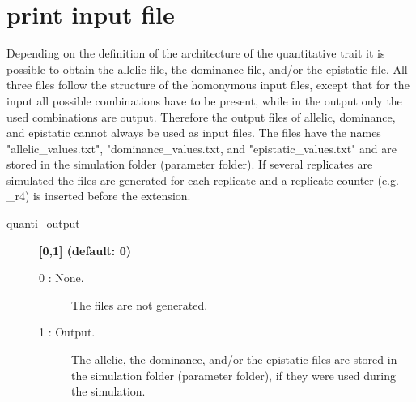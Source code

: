 \documentclass[letterpaper,12pt,oneside]{book}
\begin{document}
\section{print input file}
Depending on the definition of the architecture of the quantitative trait it is possible to obtain the allelic file, the dominance file, and/or the epistatic file. All three files follow the structure of the homonymous input files, except that for the input all possible combinations have to be present, while in the output only the used combinations are output. Therefore the output files of allelic, dominance, and epistatic cannot always be used as input files. The files have the names \textsf{"allelic\_values.txt"}, \textsf{"dominance\_values.txt}, and \textsf{"epistatic\_values.txt"} and are stored in the simulation folder (parameter \textsf{folder}). If several replicates are simulated the files are generated for each replicate and a replicate counter (e.g. \_r4) is inserted before the extension.

\begin{description}
\item[quanti\_output] \textbf{[0,1] (default: 0)}\\
\begin {description}
\item[0 : None.] The files are not generated.
\item[1 : Output.] The allelic, the dominance, and/or the epistatic files are stored in the simulation folder (parameter \textsf{folder}), if they were used during the simulation.
\end{description}
\end{description}


\clearpage
{}
{} 
 


\clearpage
{}
{} 
\printindex
\end{document}
